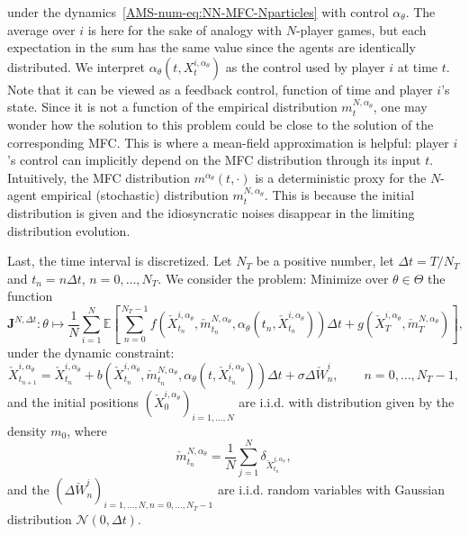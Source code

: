 \documentclass{amsproc}
\theoremstyle{definition}
\theoremstyle{remark}
\numberwithin{equation}{section}
\newcommand{\EE}{{\mathbb E}}
\newcommand{\bJ}{{\mathbf J}}
\newcommand{\ctrl}{\alpha}
\begin{document}
under the dynamics~\eqref{AMS-num-eq:NN-MFC-Nparticles} with control $\ctrl_\theta$. The average over $i$ is here for the sake of analogy with $N$-player games, but each expectation in the sum has the same value since the agents are identically distributed. We interpret $\ctrl_\theta(t,X_t^{i, \ctrl_\theta})$ as the control used by player $i$ at time $t$. Note that it can be viewed as a feedback control, function of time and player $i$'s state. Since it is not a function of the empirical distribution $m^{N, \ctrl_\theta}_t$, one may wonder how the solution to this problem could be close to the solution of the corresponding MFC. This is where a mean-field approximation is helpful: player $i$'s control can implicitly depend on the MFC distribution  through its input $t$. Intuitively, the MFC distribution $m^{\ctrl_\theta}(t,\cdot)$ is a deterministic proxy for the $N$-agent empirical (stochastic) distribution $m^{N, \ctrl_\theta}_t$. This is because the initial distribution is given and the idiosyncratic noises disappear in the limiting distribution evolution.   

Last, the time interval is discretized. Let $N_T$ be a positive number, let $\Delta t = T/N_T$ and $t_n = n \Delta t$, $n =0,\dots, N_T$. We consider the problem: Minimize over $\theta \in \Theta$ the function
\begin{equation}
\label{AMS-num-eq:NN-MFC-cost-totalapprox}
	\bJ^{N, \Delta t}: \theta \mapsto \frac{1}{N} \sum_{i=1}^N \EE \left[\sum_{n=0}^{N_T-1} f(\check X_{t_n}^{i, \ctrl_\theta}, \check m^{N, \ctrl_\theta}_{t_n}, \ctrl_\theta(t_n,\check X_{t_n}^{i, \ctrl_\theta}) ) \Delta t + g(\check X_T^{i, \ctrl_\theta}, \check m^{N,\ctrl_\theta}_T) \right],
\end{equation}
under the dynamic constraint:
\begin{equation}
\label{AMS-num-eq:NN-MFC-Nparticles-Deltat}
	\check X_{t_{n+1}}^{i, \ctrl_\theta} = \check X_{t_{n}}^{i, \ctrl_\theta} + b( \check X_{t_{n}}^{i, \ctrl_\theta}, \check m^{N, \ctrl_\theta}_{t_{n}}, \ctrl_\theta(t, \check X_{t_{n}}^{i, \ctrl_\theta})) \Delta t + \sigma \Delta \check W^i_n, \qquad n = 0, \dots, N_T-1,
\end{equation}
and the initial positions $(\check X_0^{i, \ctrl_\theta})_{i=1,\dots,N}$ are i.i.d. with distribution given by the density $m_0$, where 
$$
	\check m^{N, \ctrl_\theta}_{t_{n}} = \frac{1}{N} \sum_{j=1}^N \delta_{\check X_{t_{n}}^{j, \ctrl_\theta}}, 
$$ 
and the $(\Delta \check W_n^i)_{i=1,\dots,N,n=0,\dots,N_T-1}$ are i.i.d. random variables with Gaussian distribution $\mathcal N(0, \Delta t)$.
\end{document}
